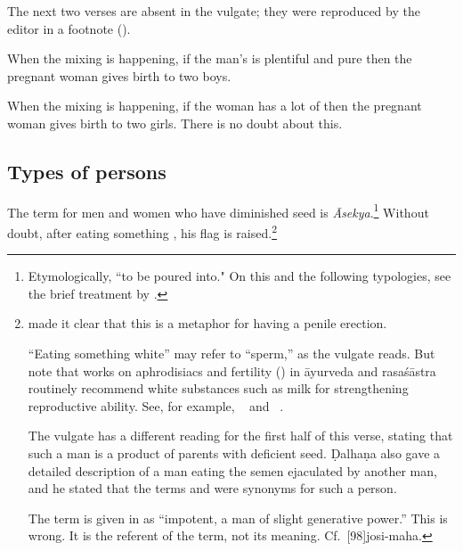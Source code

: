 \begin{translation}
{The next two verses are absent in the vulgate; they were reproduced by the 
editor in a footnote (\cite[348b, n.\,3]{vulgate}).}

\item [3.2.37.1]
\begin{sloka}
    When the mixing is happening, if the man's  is plentiful 
    and pure then the pregnant woman gives birth to two boys.
\end{sloka}

\item [3.2.37.2]
\begin{sloka}
    When the mixing is happening, if the woman has a lot of 
     then the pregnant woman gives birth to two girls.
    There is no doubt about this. 
\end{sloka}

\subsection{Types of persons}

\item[3.2.38]

The term for men and women who have diminished seed is
\emph{Āsekya}.\footnote{Etymologically, “to be poured into."  On this and the
    following typologies, see the brief treatment by
    \citet[216--217]{meul-1997}.}  Without doubt, after eating something
    , his flag is raised.\footnote{
        made it clear that this is a metaphor for having a penile
        erection.\label{erection}

“Eating something white” may refer to  “sperm,” as the
vulgate reads.  But note that works on aphrodisiacs and fertility
() in āyurveda and rasaśāstra routinely recommend
white substances such as milk for strengthening reproductive ability.
See, for example, \SS\  and \CS\ .

The vulgate has a different reading for the first half of this verse, stating that 
such a man is a product of parents with deficient seed.  Ḍalhaṇa also gave a 
detailed description of a man eating the semen ejaculated by another man, 
and he stated that the terms  and  were 
synonyms for such a person.

The term  is given in \cite[161]{moni-sans} as “impotent,
a man of slight generative power.”  This is wrong.  It is the
referent of the term, not its meaning. Cf.\ [98]{josi-maha}.

}
\end{translation}
